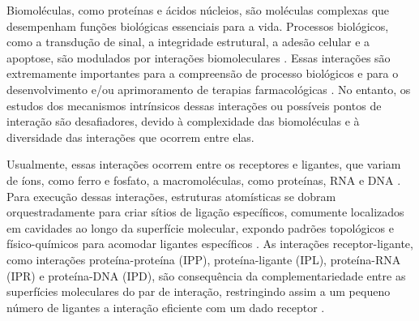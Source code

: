 \documentclass[Portugues]{phdquali}
\begin{document}

Biomoléculas, como proteínas e ácidos núcleios, são moléculas complexas que desempenham funções biológicas essenciais para a vida. Processos biológicos, como a transdução de sinal, a integridade estrutural, a adesão celular e a apoptose, são modulados por interações biomoleculares \cite{sotriffer2002,henrich2010}. Essas interações são extremamente importantes para a compreensão de processo biológicos e para o desenvolvimento e/ou aprimoramento de terapias farmacológicas \cite{henrich2010}. No entanto, os estudos dos mecanismos intrínsicos dessas interações ou possíveis pontos de interação são desafiadores, devido à complexidade das biomoléculas e à diversidade das interações que ocorrem entre elas.

Usualmente, essas interações ocorrem entre os receptores e ligantes, que variam de íons, como ferro e fosfato, a macromoléculas, como proteínas, RNA e DNA \cite{oliveira2014}. Para execução dessas interações, estruturas atomísticas se dobram orquestradamente para criar sítios de ligação específicos, comumente localizados em cavidades ao longo da superfície molecular, expondo padrões topológicos e físico-químicos para acomodar ligantes específicos \cite{henrich2010,guerra2021}. As interações receptor-ligante, como interações proteína-proteína (IPP), proteína-ligante (IPL), proteína-RNA (IPR) e proteína-DNA (IPD), são consequência da complementariedade entre as superfícies moleculares do par de interação, restringindo assim a um pequeno número de ligantes a interação eficiente com um dado receptor \cite{henrich2010,simoes2017}.
\end{document}
